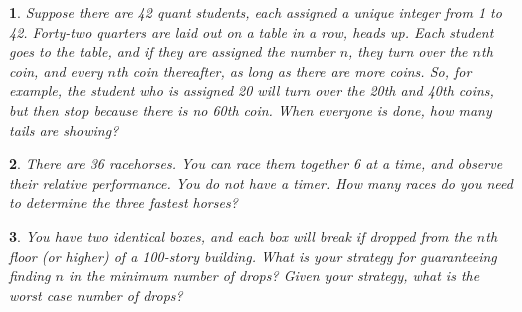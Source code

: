 \documentclass{report}
\newtheorem{problem}{}
\numberwithin{problem}{chapter} %
\begin{document}
\begin{problem}
Suppose there are 42 quant students, each assigned a unique integer from 1 to 42. Forty-two quarters are laid out on a table in a row, heads up. Each student goes to the table, and if they are assigned the number $n$, they turn over the $n$th coin, and every $n$th coin thereafter, as long as there are more coins. So, for example, the student who is assigned 20 will turn over the 20th and 40th coins, but then stop because there is no 60th coin. When everyone is done, how many tails are showing?
\end{problem}

\begin{problem}
There are 36 racehorses. You can race them together 6 at a time, and observe their relative performance. You do not have a timer. How many races do you need to determine the three fastest horses?
\end{problem}

\begin{problem}
You  have two identical boxes, and each box will break if dropped from the $n$th floor (or higher) of a 100-story building. What is your strategy for guaranteeing finding $n$ in the minimum number of drops? Given your strategy, what is the worst case number of drops?
\end{problem}

\printbibliography
\end{document}
